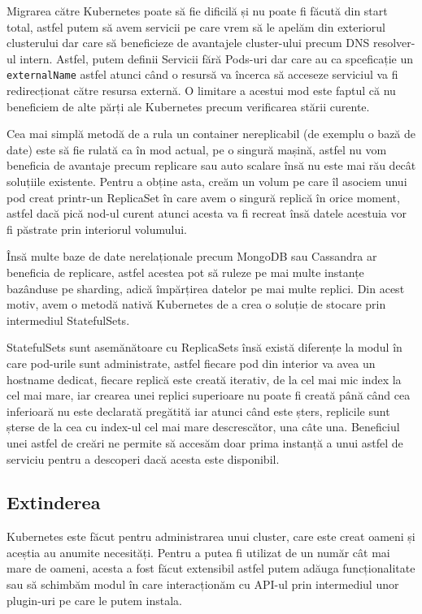 Migrarea către Kubernetes poate să fie dificilă și nu poate fi făcută din start 
total, astfel putem să avem servicii pe care vrem să le apelăm din exteriorul 
clusterului dar care să beneficieze de avantajele cluster-ului precum DNS resolver-ul intern.
Astfel, putem definii Servicii fără Pods-uri dar care au ca spceficație
un \verb|externalName| astfel atunci când o resursă va încerca să acceseze serviciul
va fi redirecționat către resursa externă. O limitare a acestui mod este faptul că
nu beneficiem de alte părți ale Kubernetes precum verificarea stării curente.

Cea mai simplă metodă de a rula un container nereplicabil (de exemplu o bază de date)
este să fie rulată ca în mod actual, pe o singură mașină, astfel nu vom beneficia 
de avantaje precum replicare sau auto scalare însă nu este mai rău decât soluțiile existente.
Pentru a obține asta, creăm un volum pe care îl asociem unui pod creat printr-un ReplicaSet 
în care avem o singură replică în orice moment, astfel dacă pică nod-ul curent atunci acesta va fi recreat
însă datele acestuia vor fi păstrate prin interiorul volumului.

Însă multe baze de date nerelaționale precum MongoDB sau Cassandra ar beneficia de replicare,
astfel acestea pot să ruleze pe mai multe instanțe bazânduse pe sharding, adică împărțirea
datelor pe mai multe replici. Din acest motiv, avem o metodă nativă Kubernetes de a crea
o soluție de stocare prin intermediul StatefulSets.

StatefulSets sunt asemănătoare cu ReplicaSets însă există diferențe la modul 
în care pod-urile sunt administrate, astfel fiecare pod din interior va avea 
un hostname dedicat, fiecare replică este creată iterativ, de la cel mai mic index 
la cel mai mare, iar crearea unei replici superioare nu poate fi creată până când 
cea inferioară nu este declarată pregătită iar atunci când este șters, replicile sunt șterse
de la cea cu index-ul cel mai mare descrescător, una câte una. Beneficiul unei astfel de creări ne 
permite să accesăm doar prima instanță a unui astfel de serviciu pentru a descoperi dacă 
acesta este disponibil.

\subsection{Extinderea}

Kubernetes este făcut pentru administrarea unui cluster, care este creat
oameni și aceștia au anumite necesități. Pentru a putea fi utilizat de un număr 
cât mai mare de oameni, acesta a fost făcut extensibil astfel putem adăuga
funcționalitate sau să schimbăm modul în care interacționăm cu API-ul prin intermediul
unor plugin-uri pe care le putem instala.

